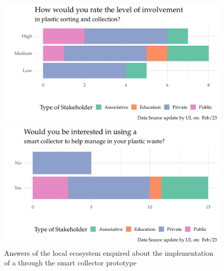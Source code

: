 \documentclass[
  11pt,
]{article}
\begin{document}
\begin{figure}

\begin{minipage}[b]{0.50\linewidth}

{\centering 

\includegraphics{figures/fedoua/Acceptability-01.pdf}

}

\end{minipage}%
%
\begin{minipage}[b]{0.50\linewidth}

{\centering 

\includegraphics{figures/fedoua/Acceptability-02.pdf}

}

\end{minipage}%

\caption{\label{fig-acceptability}Answers of the local ecosystem
enquired about the implementation of a through the smart collector
prototype}

\end{figure}
\end{document}
